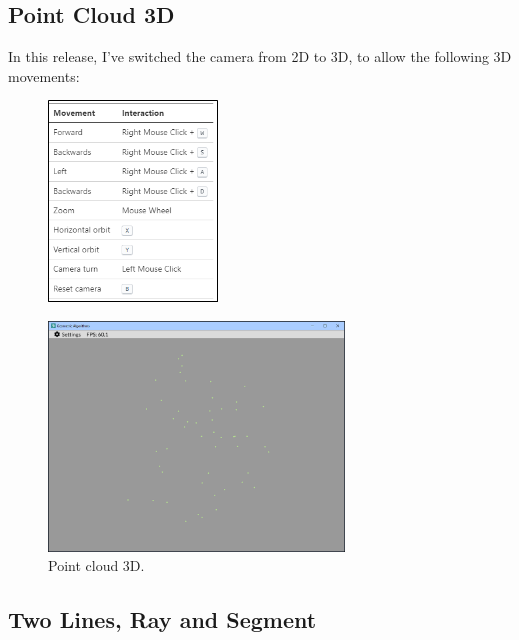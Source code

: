 \documentclass[12pt,a4paper,english]{article}
\begin{document}
\subsection{Point Cloud 3D}

In this release, I've switched the camera from 2D to 3D, to allow the following 3D movements:

\begin{figure}[H]
    \centering
    \includegraphics[width=0.4\textwidth]{movements}
    \captionsetup{labelformat=empty}
    \caption[]{}
    \label{fig:movements}
\end{figure}

\begin{figure}[H]
    \centering
    \includegraphics[width=0.7\textwidth]{p2a-1}
    \caption[]{Point cloud 3D.}
    \label{fig:p2a-1}
\end{figure}

\subsection{Two Lines, Ray and Segment}
\end{document}

